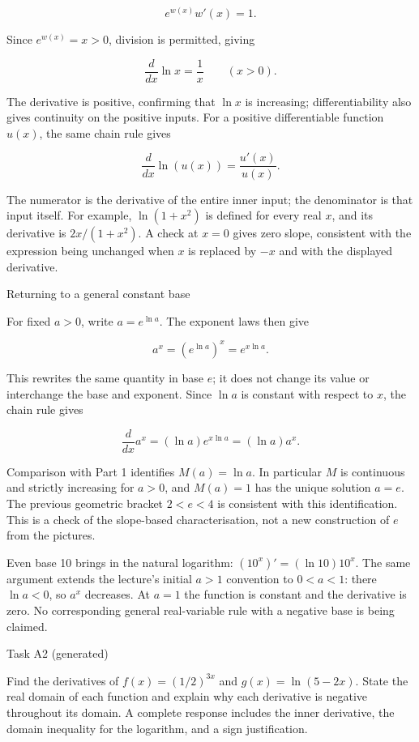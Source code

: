 \documentclass[
  11pt,
]{article}
\providecommand{\gt}{>}
\providecommand{\lt}{<}
\begin{document}
\[
e^{w(x)}w'(x)=1.
\]

Since \(e^{w(x)}=x\gt 0\), division is permitted, giving

\[
\frac{d}{dx}\ln x=\frac1x\qquad(x\gt 0).
\]

The derivative is positive, confirming that \(\ln x\) is increasing;
differentiability also gives continuity on the positive inputs. For a
positive differentiable function \(u(x)\), the same chain rule gives

\[
\frac{d}{dx}\ln(u(x))=\frac{u'(x)}{u(x)}.
\]

The numerator is the derivative of the entire inner input; the
denominator is that input itself. For example, \(\ln(1+x^2)\) is defined
for every real \(x\), and its derivative is \(2x/(1+x^2)\). A check at
\(x=0\) gives zero slope, consistent with the expression being unchanged
when \(x\) is replaced by \(-x\) and with the displayed derivative.

Returning to a general constant base

For fixed \(a\gt 0\), write \(a=e^{\ln a}\). The exponent laws then give

\[
a^x=(e^{\ln a})^x=e^{x\ln a}.
\]

This rewrites the same quantity in base \(e\); it does not change its
value or interchange the base and exponent. Since \(\ln a\) is constant
with respect to \(x\), the chain rule gives

\[
\frac{d}{dx}a^x=(\ln a)e^{x\ln a}=(\ln a)a^x.
\]

Comparison with Part 1 identifies \(M(a)=\ln a\). In particular \(M\) is
continuous and strictly increasing for \(a\gt 0\), and \(M(a)=1\) has
the unique solution \(a=e\). The previous geometric bracket
\(2\lt e\lt 4\) is consistent with this identification. This is a check
of the slope-based characterisation, not a new construction of \(e\)
from the pictures.

Even base 10 brings in the natural logarithm: \((10^x)'=(\ln10)10^x\).
The same argument extends the lecture's initial \(a\gt 1\) convention to
\(0\lt a\lt 1\): there \(\ln a\lt 0\), so \(a^x\) decreases. At \(a=1\)
the function is constant and the derivative is zero. No corresponding
general real-variable rule with a negative base is being claimed.

Task A2 (generated)

Find the derivatives of \(f(x)=(1/2)^{3x}\) and \(g(x)=\ln(5-2x)\).
State the real domain of each function and explain why each derivative
is negative throughout its domain. A complete response includes the
inner derivative, the domain inequality for the logarithm, and a sign
justification.
\end{document}
